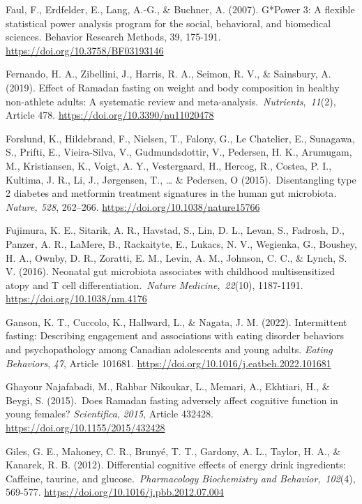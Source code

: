 \documentclass[authordate, empirical,issue]{jote-new-article}
\begin{document}
Faul, F., Erdfelder, E., Lang, A.-G., \& Buchner, A. (2007). G*Power 3: A flexible statistical power analysis program for the social, behavioral, and biomedical sciences. Behavior Research Methods, 39, 175-191. \url{https://doi.org/10.3758/BF03193146}



Fernando, H. A., Zibellini, J., Harris, R. A., Seimon, R. V., \& Sainsbury, A. (2019). Effect of Ramadan fasting on weight and body composition in healthy non-athlete adults: A systematic review and meta-analysis. \emph{Nutrients}, \emph{11}(2), Article 478. \url{https://doi.org/10.3390/nu11020478}



Forslund, K., Hildebrand, F., Nielsen, T., Falony, G., Le Chatelier, E., Sunagawa, S., Prifti, E., Vieira-Silva, V., Gudmundsdottir, V., Pedersen, H. K., Arumugam, M., Kristiansen, K., Voigt, A. Y., Vestergaard, H., Hercog, R., Costea, P. I., Kultima, J. R., Li, J., Jørgensen, T., … \& Pedersen, O (2015). Disentangling type 2 diabetes and metformin treatment signatures in the human gut microbiota\emph{. Nature, 528}, 262--266. \url{https://doi.org/10.1038/nature15766}



Fujimura, K. E., Sitarik, A. R., Havstad, S., Lin, D. L., Levan, S., Fadrosh, D., Panzer, A. R., LaMere, B., Rackaityte, E., Lukacs, N. V., Wegienka, G., Boushey, H. A., Ownby, D. R., Zoratti, E. M., Levin, A. M., Johnson, C. C., \& Lynch, S. V. (2016). Neonatal gut microbiota associates with childhood multisensitized atopy and T cell differentiation. \emph{Nature Medicine}, \emph{22}(10), 1187-1191. \url{https://doi.org/10.1038/nm.4176}



Ganson, K. T., Cuccolo, K., Hallward, L., \& Nagata, J. M. (2022). Intermittent fasting: Describing engagement and associations with eating disorder behaviors and psychopathology among Canadian adolescents and young adults. \emph{Eating Behaviors}, \emph{47}, Article 101681. \href{https://doi.org/10.1016/j.eatbeh.2022.101681}{https://doi.org/10.1016/j.eatbeh.2022.101681}



Ghayour Najafabadi, M., Rahbar Nikoukar, L., Memari, A., Ekhtiari, H., \& Beygi, S. (2015). Does Ramadan fasting adversely affect cognitive function in young females?\emph{ Scientifica}, \emph{2015}, Article 432428. \url{https://doi.org/10.1155/2015/432428}



Giles, G. E., Mahoney, C. R., Brunyé, T. T., Gardony, A. L., Taylor, H. A., \& Kanarek, R. B. (2012). Differential cognitive effects of energy drink ingredients: Caffeine, taurine, and glucose. \emph{Pharmacology Biochemistry and Behavior}, \emph{102}(4), 569-577. \url{https://doi.org/10.1016/j.pbb.2012.07.004}
\end{document}
